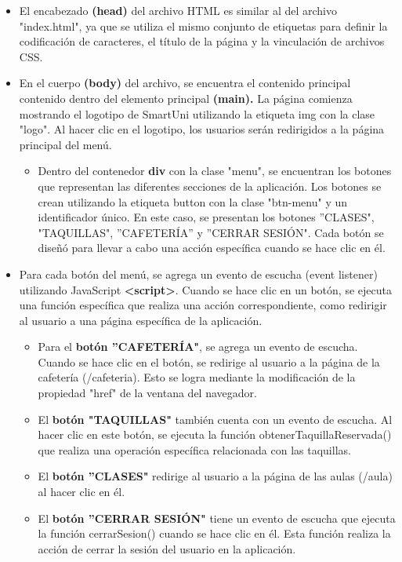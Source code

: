 \documentclass[12pt]{report}
\begin{document}
\begin{itemize}
    \item El encabezado \textbf{(head) }del archivo HTML es similar al del archivo "index.html", ya que se utiliza el mismo conjunto de etiquetas para definir la codificación de caracteres, el título de la página y la vinculación de archivos CSS.

    \item En el cuerpo \textbf{(body)} del archivo, se encuentra el contenido principal contenido dentro del elemento principal\textbf{ (main).} La página comienza mostrando el logotipo de SmartUni utilizando la etiqueta img con la clase "logo". Al hacer clic en el logotipo, los usuarios serán redirigidos a la página principal del menú.

    \begin{itemize}
        \item Dentro del contenedor \textbf{div} con la clase "menu", se encuentran los botones que representan las diferentes secciones de la aplicación. Los botones se crean utilizando la etiqueta button con la clase "btn-menu" y un identificador único. En este caso, se presentan los botones ''CLASES", "TAQUILLAS", ''CAFETERÍA'' y ''CERRAR SESIÓN". Cada botón se diseñó para llevar a cabo una acción específica cuando se hace clic en él.
    \end{itemize}

\item Para cada botón del menú, se agrega un evento de escucha (event listener) utilizando JavaScript \textbf{\textless script\textgreater}. Cuando se hace clic en un botón, se ejecuta una función específica que realiza una acción correspondiente, como redirigir al usuario a una página específica de la aplicación.
    \begin{itemize}
        \item Para el\textbf{ botón ''CAFETERÍA"}, se agrega un evento de escucha. Cuando se hace clic en el botón, se redirige al usuario a la página de la cafetería (/cafeteria). Esto se logra mediante la modificación de la propiedad "href" de la ventana del navegador.
        
        \item El \textbf{botón "TAQUILLAS"} también cuenta con un evento de escucha. Al hacer clic en este botón, se ejecuta la función obtenerTaquillaReservada() que realiza una operación específica relacionada con las taquillas.
        
        \item El \textbf{botón ''CLASES" }redirige al usuario a la página de las aulas (/aula) al hacer clic en él.
        
        \item El \textbf{botón ''CERRAR SESIÓN" }tiene un evento de escucha que ejecuta la función cerrarSesion() cuando se hace clic en él. Esta función realiza la acción de cerrar la sesión del usuario en la aplicación.
    \end{itemize}
\end{itemize}
\end{document}
